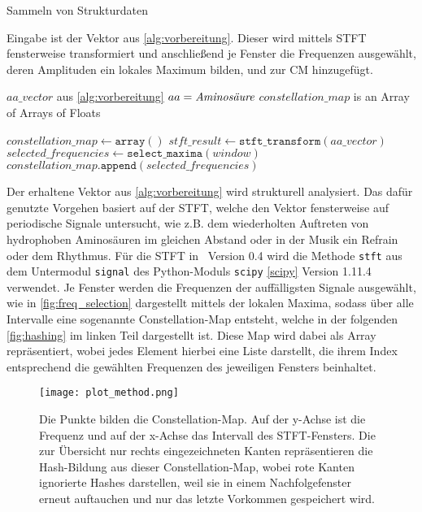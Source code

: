         \begin{algorithm}[H]
            \caption{Sammeln von Strukturdaten}\label{alg:strukturdaten}
            Eingabe ist der Vektor aus \autoref{alg:vorbereitung}. Dieser wird mittels \acs{STFT} fensterweise transformiert und anschließend je Fenster die Frequenzen ausgewählt, deren Amplituden ein lokales Maximum bilden, und zur \acl{CM} hinzugefügt.
            \begin{algorithmic}[1]
                \Require $aa\_vector$ aus \autoref{alg:vorbereitung} \Comment $aa = \emph{Aminosäure}$
                \Ensure $constellation\_map$ is an Array of Arrays of Floats

                \State $constellation\_map \gets \texttt{array}()$
                \State $stft\_result \gets \texttt{stft\_transform}(aa\_vector)$
                    \State $selected\_frequencies \gets \texttt{select\_maxima}(window)$
                    \State $constellation\_map.\texttt{append}(selected\_frequencies)$
                \EndFor
            \end{algorithmic}
        \end{algorithm}
        Der erhaltene Vektor aus \autoref{alg:vorbereitung} wird strukturell analysiert. Das dafür genutzte Vorgehen basiert auf der \ac{STFT}, welche den Vektor fensterweise auf periodische Signale untersucht, wie z.B. dem wiederholten Auftreten von hydrophoben Aminosäuren im gleichen Abstand oder in der Musik ein Refrain oder dem Rhythmus. Für die \ac{STFT} in \protfin\ Version 0.4 wird die Methode \texttt{stft} aus dem Untermodul \texttt{signal} des Python-Moduls \texttt{scipy} \autoref{scipy} Version 1.11.4 verwendet. Je Fenster werden die Frequenzen der auffälligsten Signale ausgewählt, wie in \autoref{fig:freq_selection} dargestellt mittels der lokalen Maxima, sodass über alle Intervalle eine sogenannte Constellation-Map entsteht, welche in der folgenden \autoref{fig:hashing} im linken Teil dargestellt ist. Diese Map wird dabei als Array repräsentiert, wobei jedes Element hierbei eine Liste darstellt, die ihrem Index entsprechend die gewählten Frequenzen des jeweiligen Fensters beinhaltet.

        \begin{figure}[H]
            \centering
            \texttt{[image: plot\_method.png]}
            \caption[Constellation-Map und Hashing]{Die Punkte bilden die Constellation-Map. Auf der y-Achse ist die Frequenz und auf der x-Achse das Intervall des STFT-Fensters. Die zur Übersicht nur rechts eingezeichneten Kanten repräsentieren die Hash-Bildung aus dieser Constellation-Map, wobei rote Kanten ignorierte Hashes darstellen, weil sie in einem Nachfolgefenster erneut auftauchen und nur das letzte Vorkommen gespeichert wird.}
            \label{fig:hashing}
        \end{figure}

